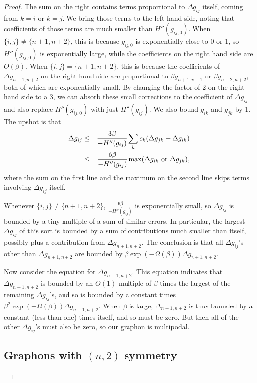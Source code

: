 \documentclass[12pt]{amsart}
\begin{document}
{\begin{proof}
The sum on the right contains terms proportional to $\Delta g_{ij}$ itself, coming from $k=i$ or $k=j$. We bring those terms to the left hand side, noting that coefficients of those terms are much smaller than $H''(g_{ij,0})$.
When $\{i,j\} \ne \{n+1,n+2\}$, this is because $g_{ij,0}$ is exponentially close to 0 or 1, so $H''(g_{ij,0})$ is exponentially large, while the coefficients on the right hand side are $O(\beta)$. 
When $\{i,j\} = \{n+1,n+2\}$, this 
is because the coefficients of $\Delta g_{n+1,n+2}$ on the right hand side are proportional to 
$\beta g_{n+1,n+1}$ or $\beta g_{n+2,n+2}$, both of which are exponentially small. By changing the 
factor of 2 on the right hand side to a 3, we can absorb these small corrections to the coefficient of 
$\Delta g_{ij}$ and also replace $H''(g_{ij,0})$ with just $H''(g_{ij})$. We also bound $g_{ik}$ and 
$g_{jk}$ by 1. The upshot is that 
\begin{eqnarray}
\Delta g_{ij} & \le & \frac{3\beta}{-H''(g_{ij})} \sum_k c_k (\Delta g_{jk} + \Delta g_{ik}) \cr 
& \le & \frac{6\beta}{-H''(g_{ij})} \max(\Delta g_{ik} \hbox{ or } \Delta g_{jk}),
\end{eqnarray}
where the sum on the first line and the maximum on the second line skips terms involving $\Delta g_{ij}$
itself. 

Whenever $\{i,j\} \ne \{n+1,n+2\}$, $\frac{6\beta}{-H''(g_{ij})}$ is exponentially small, so $\Delta g_{ij}$
is bounded by a tiny multiple of a sum of similar errors. In particular, the largest $\Delta g_{ij}$ of 
this sort is bounded by a sum of contributions much smaller than itself, possibly plus a contribution
from $\Delta g_{n+1, n+2}$. The conclusion is that all $\Delta g_{ij}$'s other than $\Delta g_{n+1,n+2}$ 
are bounded by $\beta \exp(-\Omega(\beta)) \Delta g_{n+1,n+2}$. 

Now consider the equation for $\Delta g_{n+1,n+2}$. This equation 
indicates that $\Delta g_{n+1,n+2}$ is bounded by an $O(1)$ multiple of $\beta$ times the largest of 
the remaining $\Delta g_{ij}$'s, and so is bounded by a constant times 
$\beta^2 \exp(-\Omega(\beta)) \Delta g_{n+1,n+2}$. When $\beta$ is large, $\Delta_{n+1,n+2}$ is thus 
bounded by a constant
(less than one) times itself, and so must be zero. But then all of the other $\Delta g_{ij}$'s must also
be zero, so our graphon is multipodal. 


\subsection{Graphons with $(n,2)$ symmetry}


\end{proof}}
\end{document}
